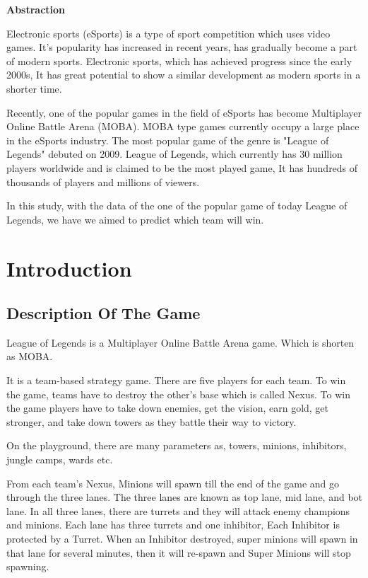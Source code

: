 \documentclass[a4paper]{article}
\begin{document}
{\centering\LARGE\bfseries
  Abstraction\par
}
\medskip
{\centering\large
Electronic sports (eSports) is a type of sport competition which uses video games.
It's popularity has increased in recent years, has gradually become a part of modern sports.
Electronic sports, which has achieved progress since the early 2000s,
It has great potential to show a similar development as modern sports in a shorter time.

Recently, one of the popular games in the field of eSports has become Multiplayer Online Battle Arena (MOBA). MOBA type games currently occupy a large place in the eSports industry. The most popular game of the genre is "League of Legends"  debuted on 2009. League of Legends, which currently has 30 million players worldwide and is claimed to be the most played game,
It has hundreds of thousands of players and millions of viewers.

In this study, with the data of the one of the popular game of today League of Legends,  we have we aimed to predict which team will win. \par}
\bigskip
\pagebreak


\setcounter{section}{0}
\section{Introduction}

\subsection{Description Of The Game}
League of Legends is a Multiplayer Online Battle Arena game. Which is shorten as MOBA.
\medskip
  
It is a team-based strategy game. There are five players for each team. To win the game, teams have to destroy the other's base which is called Nexus. To win the game players have to take down enemies, get the vision, earn gold, get stronger, and take down towers as they battle their way to victory.
\medskip
    
On the playground, there are many parameters as, towers, minions, inhibitors, jungle camps, wards etc.
\medskip

From each team's Nexus, Minions will spawn till the end of the game and go through the three lanes. The three lanes are known as top lane, mid lane, and bot lane. In all three lanes, there are turrets and they will attack enemy champions and minions. Each lane has three turrets and one inhibitor, Each Inhibitor is protected by a Turret. When an Inhibitor destroyed, super minions will spawn in that lane for several minutes, then it will re-spawn and Super Minions will stop spawning. 
\end{document}
